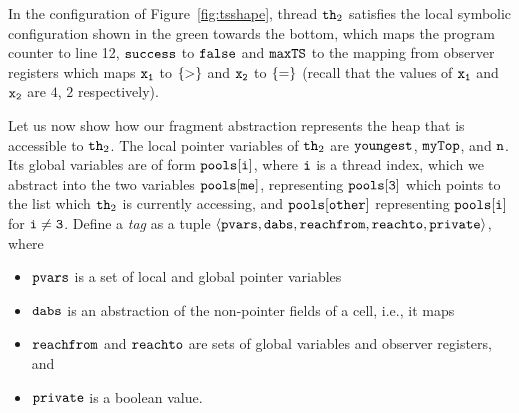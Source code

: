 In the configuration of Figure~\ref{fig:tsshape}, thread ${\tt th}_2$
satisfies the local symbolic configuration shown in the green towards the
bottom, 
which maps the program counter to line 12, ${\tt success}$ to ${\tt false}$ and ${\tt maxTS}$ to the mapping from observer registers which maps
$\tt x_1$ to $\left\{>\right\}$ and $\tt x_2$ to $\left\{=\right\}$
(recall that the values of $\tt x_1$ and $\tt x_2$ are $4$, $2$ respectively).



Let us now show how our fragment abstraction represents the heap that is
accessible to ${\tt th}_2$.
The local pointer variables of ${\tt th}_2$ are 
${\tt youngest}$, ${\tt myTop}$, and ${\tt n}$. Its global variables are of form
${\tt pools[i]}$, where ${\tt i}$ is a thread index, which we abstract into the
two variables ${\tt pools[me]}$, representing ${\tt pools[3]}$
which points to the list which ${\tt th}_2$ is currently accessing,
and ${\tt pools[other]}$ representing ${\tt pools[i]}$ for $\tt i \neq 3$.
Define a {\em tag} as a tuple
$\left\langle\mathtt{pvars},\mathtt{dabs},\mathtt{reachfrom},\mathtt{reachto},\mathtt{private}\right\rangle$, where
\begin{itemize}
\item
  $\mathtt{pvars}$ is a set of local and global pointer variables
\item
  $\mathtt{dabs}$ is an abstraction of the non-pointer fields of a cell,
  i.e., it maps
\item
  $\mathtt{reachfrom}$ and $\mathtt{reachto}$ are sets of global variables and observer registers, and %
\item
  $\mathtt{private}$ is a boolean value.
\end{itemize}
